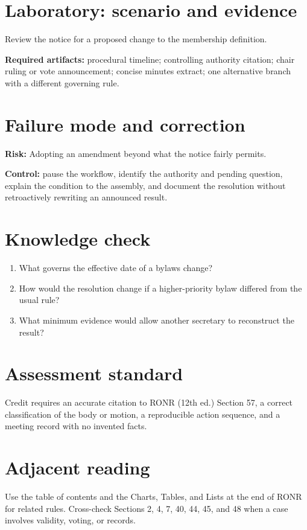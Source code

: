\documentclass[11pt]{article}
\begin{document}
\section{Laboratory: scenario and evidence}
Review the notice for a proposed change to the membership definition.

\textbf{Required artifacts:} procedural timeline; controlling authority citation; chair ruling or vote announcement; concise minutes extract; one alternative branch with a different governing rule.

\section{Failure mode and correction}
\textbf{Risk:} Adopting an amendment beyond what the notice fairly permits.

\textbf{Control:} pause the workflow, identify the authority and pending question, explain the condition to the assembly, and document the resolution without retroactively rewriting an announced result.

\section{Knowledge check}
\begin{enumerate}[leftmargin=*,itemsep=4pt]
\item What governs the effective date of a bylaws change?
\item How would the resolution change if a higher-priority bylaw differed from the usual rule?
\item What minimum evidence would allow another secretary to reconstruct the result?
\end{enumerate}

\section{Assessment standard}
Credit requires an accurate citation to RONR (12th ed.) Section 57, a correct classification of the body or motion, a reproducible action sequence, and a meeting record with no invented facts.

\section{Adjacent reading}
Use the table of contents and the Charts, Tables, and Lists at the end of RONR for related rules. Cross-check Sections 2, 4, 7, 40, 44, 45, and 48 when a case involves validity, voting, or records.
\end{document}
